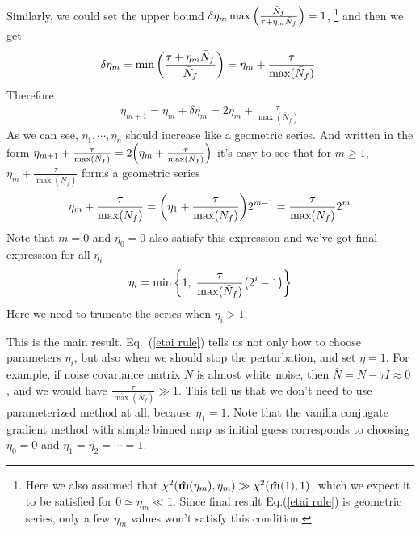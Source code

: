 \documentclass[11pt, letterpaper]{article}
\newcommand{\hatm}{\vb{\hat{m}}}
\newcommand{\Nbar}{\bar{N}}
\begin{document}
Similarly, we could set the upper bound
$\delta\eta_m \max \qty( \frac{\Nbar_f}{\tau + \eta_m \Nbar_f})=1$,
\footnote{Here we also assumed that
$\chi^2(\hatm(\eta_m),\eta_m) \gg \chi^2(\hatm(1),1)$,
which we expect it to be satisfied for $0 \simeq \eta_m \ll 1$. 
Since final result Eq.(\ref{etai rule}) is geometric series,
only a few $\eta_m$ values won't satisfy this condition.
}
and then we get
\begin{align}
\delta \eta_m 
= \min \qty(\frac{\tau + \eta_m \Nbar_f}{\Nbar_f})
= \eta_m + \frac{\tau }{\max(\Nbar_f)}.
\end{align}
Therefore 
\begin{align}
\eta_{m+1} = \eta_m + \delta\eta_m = 2\eta_m + \frac{\tau }{\max (\Nbar_f)}
\end{align}
As we can see, $\eta_1, \cdots, \eta_n$ should increase like a geometric
series. 
And written in the form $\eta_{m+1} + \frac{\tau }{\max(\Nbar_f)}
= 2 \qty( \eta_m + \frac{\tau}{\max(\Nbar_f)})$
it's easy to see that for $m \geq 1$,
$\eta_{m} + \frac{\tau }{\max(\Nbar_f)}$ forms a geometric series
\begin{align}
\eta_m +  \frac{\tau }{\max(\Nbar_f)}
=\qty(\eta_1 + \frac{\tau }{\max(\Nbar_f)}) 2^{m-1}
=\frac{\tau}{\max(\Nbar_f)} 2^m
\end{align}
Note that $m = 0$ and $\eta_0 = 0$ also satisfy this expression and we've got
final expression for all $\eta_i$
\begin{align}
\eta_i =\min \qty\bigg{1,\; \frac{\tau}{\max(\Nbar_f)} \qty(2^i -1) }
\label{etai rule}
\end{align}
Here we need to truncate the series when $\eta_i > 1$.

This is the main result.  Eq.~(\ref{etai rule}) tells us not only how to choose parameters $\eta_i$,
but also when we should stop the perturbation, and set $\eta = 1$.
For example, if noise covariance matrix $N$ is almost white noise,
then $\Nbar = N - \tau I \approx 0$,
and we would have $\frac{\tau}{\max(\Nbar_f)} \gg 1$.
This tell us that we don't need to use parameterized method at all, 
because $\eta_1 = 1$.
Note that the vanilla conjugate gradient method with simple binned map as
initial guess corresponds to choosing $\eta_0=0$ and $\eta_1= \eta_2 = \cdots
= 1$.
\end{document}
